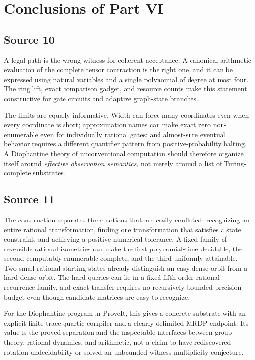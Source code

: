 \documentclass[11pt,letterpaper]{article}
\numberwithin{equation}{section}
\theoremstyle{definition}
\theoremstyle{remark}
\begin{document}
\section{Conclusions of Part VI}
\label{pqc:conv:b62-VI:conclusions}
\subsection{Source 10}

A legal path is the wrong witness for coherent acceptance. A canonical
arithmetic evaluation of the complete tensor contraction is the right one,
and it can be expressed using natural variables and a single polynomial of
degree at most four. The ring lift, exact comparison gadget, and resource
counts make this statement constructive for gate circuits and adaptive
graph-state branches.

The limits are equally informative. Width can force many coordinates even
when every coordinate is short; approximation names can make exact zero
non-enumerable even for individually rational gates; and almost-sure eventual
behavior requires a different quantifier pattern from positive-probability
halting. A Diophantine theory of unconventional computation should therefore
organize itself around \emph{effective observation semantics}, not merely
around a list of Turing-complete substrates.
\subsection{Source 11}

The construction separates three notions that are easily conflated:
recognizing an entire rational transformation, finding one transformation
that satisfies a state constraint, and achieving a positive numerical
tolerance. A fixed family of reversible rational isometries can make the
first polynomial-time decidable, the second computably enumerable
complete, and the third uniformly attainable. Two small rational starting
states already distinguish an easy dense orbit from a hard dense orbit.
The hard queries can lie in a fixed fifth-order rational recurrence
family, and exact transfer requires no recursively bounded precision
budget even though candidate matrices are easy to recognize.

For the Diophantine program in ProveIt, this gives a concrete substrate
with an explicit finite-trace quartic compiler and a clearly delimited
MRDP endpoint. Its value is the proved separation and the inspectable
interfaces between group theory, rational dynamics, and arithmetic, not
a claim to have rediscovered rotation undecidability or solved an
unbounded witness-multiplicity conjecture.
\end{document}
